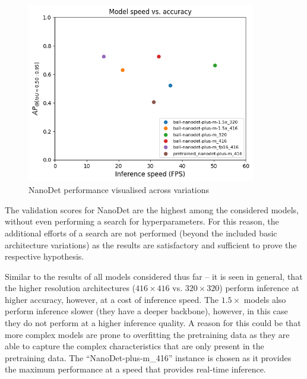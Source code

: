 \documentclass[a4paper,twoside,12pt]{report}
\begin{document}
\begin{figure}[h!]
\begin{center}
\includegraphics[width=10cm]{images/nanodet_compare.png}
\caption{NanoDet performance visualised across variations}
\label{fig:nanodet_compare}
\end{center}
\end{figure}

The validation scores for NanoDet are the highest among the considered models, without even performing a search for hyperparameters. For this reason, the additional efforts of a search are not performed (beyond the included basic architecture variations) as the results are satisfactory and sufficient to prove the respective hypothesis. 

Similar to the results of all models considered thus far -- it is seen in general, that the higher resolution architectures ($416 \times 416$ vs. $320 \times 320$) perform inference at higher accuracy, however, at a cost of inference speed. The $1.5\times$ models also perform inference slower (they have a deeper backbone), however, in this case they do not perform at a higher inference quality. A reason for this could be that more complex models are prone to overfitting the pretraining data as they are able to capture the complex characteristics that are only present in the pretraining data. The ``NanoDet-plus-m\_416'' instance is chosen as it provides the maximum performance at a speed that provides real-time inference.

\end{document}
